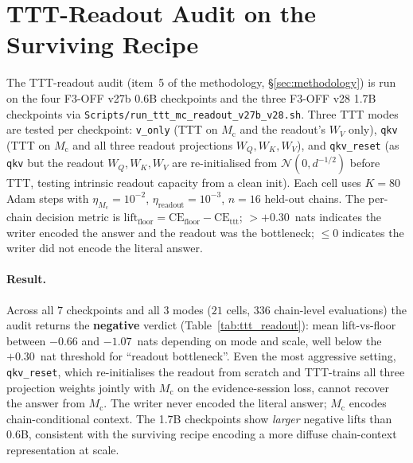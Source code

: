 \documentclass{article}
\newcommand{\Mc}{M_{\mathrm{c}}}
\newcommand{\CEfloor}{\mathrm{CE}_{\mathrm{floor}}}
\begin{document}
\section{TTT-Readout Audit on the Surviving Recipe}
\label{app:ttt_readout}

The TTT-readout audit (item~5 of the methodology,
\S\ref{sec:methodology}) is run on the four F3-OFF v27b 0.6B
checkpoints and the three F3-OFF v28 1.7B checkpoints via
\texttt{Scripts/run\_ttt\_mc\_readout\_v27b\_v28.sh}.  Three TTT
modes are tested per checkpoint: \texttt{v\_only} (TTT on $\Mc$ and
the readout's $W_V$ only), \texttt{qkv} (TTT on $\Mc$ and all three
readout projections $W_Q,W_K,W_V$), and \texttt{qkv\_reset} (as
\texttt{qkv} but the readout $W_Q,W_K,W_V$ are re-initialised from
$\mathcal{N}(0,d^{-1/2})$ before TTT, testing intrinsic readout
capacity from a clean init).  Each cell uses $K=80$ Adam steps with
$\eta_{\Mc}=10^{-2}$, $\eta_{\mathrm{readout}}=10^{-3}$, $n=16$
held-out chains.  The per-chain decision metric is
$\mathrm{lift}_{\mathrm{floor}} = \CEfloor - \mathrm{CE}_{\mathrm{ttt}}$;
$> +0.30$~nats indicates the writer encoded the answer and the
readout was the bottleneck; $\le 0$ indicates the writer did not
encode the literal answer.

\paragraph{Result.}  Across all $7$ checkpoints and all $3$ modes
($21$ cells, $336$ chain-level evaluations) the audit returns the
\textbf{negative} verdict (Table~\ref{tab:ttt_readout}): mean
lift-vs-floor between $-0.66$ and $-1.07$~nats depending on mode
and scale, well below the $+0.30$~nat threshold for ``readout
bottleneck''.  Even the most aggressive setting,
\texttt{qkv\_reset}, which re-initialises the readout from scratch
and TTT-trains all three projection weights jointly with $\Mc$ on
the evidence-session loss, cannot recover the answer from $\Mc$.
The writer never encoded the literal answer; $\Mc$ encodes
chain-conditional context.  The 1.7B checkpoints show \emph{larger}
negative lifts than 0.6B, consistent with the surviving recipe
encoding a more diffuse chain-context representation at scale.
\end{document}
